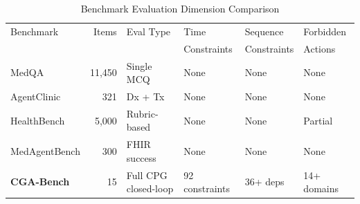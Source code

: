\begin{table}[t]
\centering
\caption{Benchmark Evaluation Dimension Comparison}
\label{tab:benchmark_dimension}
\small
\begin{tabular}{l r l l l l}
\toprule
Benchmark & Items & Eval Type & Time & Sequence & Forbidden \\
 & & & Constraints & Constraints & Actions \\
\midrule
  MedQA & 11,450 & Single MCQ & None & None & None \\
  AgentClinic & 321 & Dx + Tx & None & None & None \\
  HealthBench & 5,000 & Rubric-based & None & None & Partial \\
  MedAgentBench & 300 & FHIR success & None & None & None \\
  \textbf{CGA-Bench} & 15 & Full CPG closed-loop & 92 constraints & 36+ deps & 14+ domains \\
\bottomrule
\end{tabular}
\end{table}